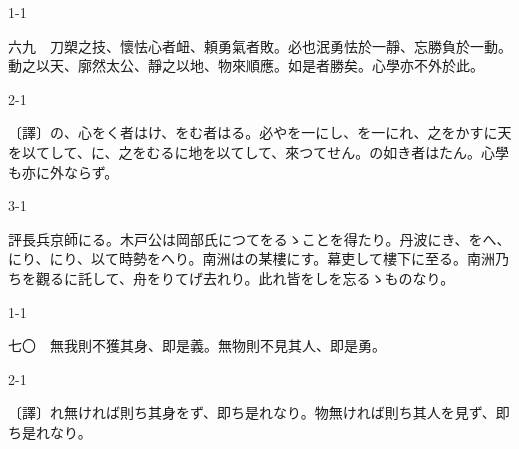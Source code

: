 \documentclass[tate,paper=b6j,jafontsize=9pt]{jlreq}
\begin{document}
\begin{azconvIndented}{1\zw}{-1\zw}

六九　刀槊之技、懷怯心者衄、頼勇氣者敗。必也泯勇怯於一靜、忘勝負於一動。動之以天、廓然太公、靜之以地、物來順應。如是者勝矣。心學亦不外於此。

\end{azconvIndented}
\begin{azconvIndented}{2\zw}{-1\zw}

〔譯〕の、心をく者はけ、をむ者はる。必やを一にし、を一にれ、之をかすに天を以てして、に、之をむるに地を以てして、來つてせん。の如き者はたん。心學も亦に外ならず。

\end{azconvIndented}
\begin{azconvIndented}{3\zw}{-1\zw}

評長兵京師にる。木戸公は岡部氏につてをるゝことを得たり。丹波にき、をへ、にり、にり、以て時勢をへり。南洲はの某樓にす。幕吏して樓下に至る。南洲乃ちを觀るに託して、舟をりてげ去れり。此れ皆をしを忘るゝものなり。

\end{azconvIndented}

\begin{azconvIndented}{1\zw}{-1\zw}

七〇　無我則不獲其身、即是義。無物則不見其人、即是勇。

\end{azconvIndented}
\begin{azconvIndented}{2\zw}{-1\zw}

〔譯〕れ無ければ則ち其身をず、即ち是れなり。物無ければ則ち其人を見ず、即ち是れなり。

\end{azconvIndented}
\end{document}
